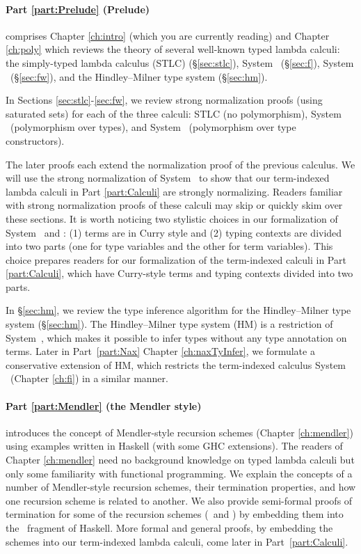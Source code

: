 \paragraph{Part \ref{part:Prelude} (Prelude)}\hspace{-1em} 
comprises Chapter \ref{ch:intro} (which you are currently reading)
and Chapter \ref{ch:poly} which 
reviews the theory of several well-known typed lambda calculi:
the simply-typed lambda calculus (STLC) (\S\ref{sec:stlc}),
System \F\ (\S\ref{sec:f}),
System \Fw\ (\S\ref{sec:fw}), and
the Hindley--Milner type system (\S\ref{sec:hm}).

In Sections \ref{sec:stlc}-\ref{sec:fw}, we review strong normalization proofs
(using saturated sets) for each of the three calculi:
STLC (no polymorphism), System \F\ (polymorphism over types), and
System \Fw\ (polymorphism over type constructors).

The later proofs each extend the normalization proof of the previous calculus.
We will use the strong normalization of System \Fw\ to show that
our term-indexed lambda calculi in Part \ref{part:Calculi} are
strongly normalizing. Readers familiar with strong normalization proofs
of these calculi may skip or quickly skim over these sections.
It is worth noticing two stylistic choices in our formalization of
System \F\ and \Fw: (1) terms are in Curry style and
(2) typing contexts are divided into two parts
    (one for type variables and the other for term variables).
This choice prepares readers for our formalization of the term-indexed calculi
in Part \ref{part:Calculi}, which have Curry-style terms and
typing contexts divided into two parts.

In \S\ref{sec:hm}, we review the type inference algorithm for
the Hindley--Milner type system (\S\ref{sec:hm}).
The Hindley--Milner type system (HM) is a restriction of System~\F,
which makes it possible to infer types without any type annotation on terms.
Later in Part~\ref{part:Nax} Chapter \ref{ch:naxTyInfer},
we formulate a conservative extension of HM, which restricts
the term-indexed calculus System \Fi\ (Chapter \ref{ch:fi}) in a similar manner.

\paragraph{Part \ref{part:Mendler} (the Mendler style)}\hspace{-1em} introduces
the concept of Mendler-style recursion schemes (Chapter \ref{ch:mendler})
using examples written in Haskell (with some GHC extensions). The readers
of Chapter \ref{ch:mendler} need no background knowledge on typed lambda calculi
but only some familiarity with functional programming. We explain the concepts of
a number of Mendler-style recursion schemes, their termination properties, and
how one recursion scheme is related to another. 
We also provide semi-formal proofs of termination
for some of the recursion schemes (\MIt\ and \MsfIt) by embedding them
into the \Fw\ fragment of Haskell. More formal and general
proofs, by embedding the schemes into our term-indexed lambda calculi, come later in
Part~\ref{part:Calculi}.


